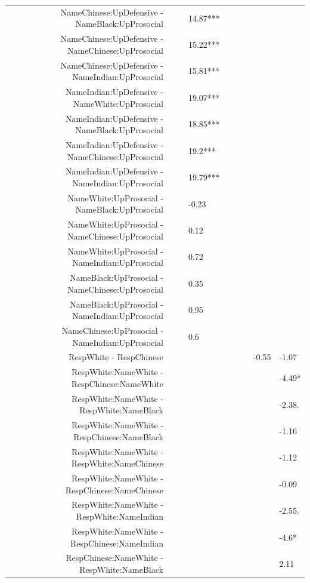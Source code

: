 \documentclass[]{report}
\begin{document}
\begin{table}[ht]
{\begin{tabular}{rllllllll}
		NameChinese:UpDefensive - NameBlack:UpProsocial &  &  & 14.87*** &  &  &  &  &  \\ 
		NameChinese:UpDefensive - NameChinese:UpProsocial &  &  & 15.22*** &  &  &  &  &  \\ 
		NameChinese:UpDefensive - NameIndian:UpProsocial &  &  & 15.81*** &  &  &  &  &  \\ 
		NameIndian:UpDefensive - NameWhite:UpProsocial &  &  & 19.07*** &  &  &  &  &  \\ 
		NameIndian:UpDefensive - NameBlack:UpProsocial &  &  & 18.85*** &  &  &  &  &  \\ 
		NameIndian:UpDefensive - NameChinese:UpProsocial &  &  & 19.2*** &  &  &  &  &  \\ 
		NameIndian:UpDefensive - NameIndian:UpProsocial &  &  & 19.79*** &  &  &  &  &  \\ 
		NameWhite:UpProsocial - NameBlack:UpProsocial &  &  & -0.23 &  &  &  &  &  \\ 
		NameWhite:UpProsocial - NameChinese:UpProsocial &  &  & 0.12 &  &  &  &  &  \\ 
		NameWhite:UpProsocial - NameIndian:UpProsocial &  &  & 0.72 &  &  &  &  &  \\ 
		NameBlack:UpProsocial - NameChinese:UpProsocial &  &  & 0.35 &  &  &  &  &  \\ 
		NameBlack:UpProsocial - NameIndian:UpProsocial &  &  & 0.95 &  &  &  &  &  \\ 
		NameChinese:UpProsocial - NameIndian:UpProsocial &  &  & 0.6 &  &  &  &  &  \\ 
		RespWhite - RespChinese &  &  &  &  &  &  & -0.55 & -1.07 \\ 
		RespWhite:NameWhite - RespChinese:NameWhite &  &  &  &  &  &  &  & -4.49* \\ 
		RespWhite:NameWhite - RespWhite:NameBlack &  &  &  &  &  &  &  & -2.38. \\ 
		RespWhite:NameWhite - RespChinese:NameBlack &  &  &  &  &  &  &  & -1.16 \\ 
		RespWhite:NameWhite - RespWhite:NameChinese &  &  &  &  &  &  &  & -1.12 \\ 
		RespWhite:NameWhite - RespChinese:NameChinese &  &  &  &  &  &  &  & -0.09 \\ 
		RespWhite:NameWhite - RespWhite:NameIndian &  &  &  &  &  &  &  & -2.55. \\ 
		RespWhite:NameWhite - RespChinese:NameIndian &  &  &  &  &  &  &  & -4.6* \\ 
		RespChinese:NameWhite - RespWhite:NameBlack &  &  &  &  &  &  &  & 2.11 \\ 

\end{tabular}}
\end{table}
\end{document}
